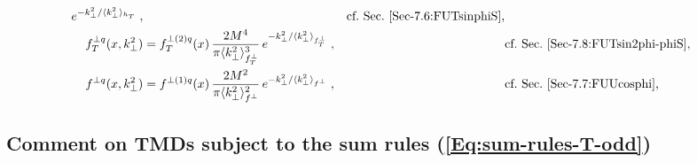 \documentclass[a4paper,11pt]{article}
\newcommand{\la}{\langle}
\newcommand{\ra}{\rangle}
\def\kperp{k_\perp}
\def\avkperp{\la \kperp^2 \ra}
\begin{document}
{\begin{subequations}
\begin{align}
		e^{-\kperp^2/{\avkperp_{h_{T}}}}\;,
	  && 	\mbox{cf.\ Sec.~\ref{Sec-7.6:FUTsinphiS},}
		\label{eq:hTnew}\\
	f^{\perp q}_{T}(x,\kperp^2) 
	  &= 	f^{\perp (2) q}_{T}(x)\,\frac{2 M^4}{\pi \avkperp^3_{f_{T}^{\perp} }}\,
		e^{-\kperp^2/{\avkperp_{f_{T}^{\perp} }}}\;,
	  && 	\mbox{cf.\ Sec.~\ref{Sec-7.8:FUTsin2phi-phiS},}
		\label{eq:ftperpnew}\\
	f^{\perp q}(x,\kperp^2) 
	  &= 	f^{\perp (1) q}(x) \,\frac{2 M^2}{\pi \avkperp_{f^\perp}^2}\,
		e^{-\kperp^2/{\avkperp_{f^\perp}}}\;,
	  && 	\mbox{cf.\ Sec.~\ref{Sec-7.7:FUUcosphi},}
		\label{eq:fperpnew}
\end{align}\end{subequations}

{}


\subsection{Comment on TMDs subject to the sum rules (\ref{Eq:sum-rules-T-odd})}
\label{App-B:comment-Todd-twist-3}

}
\end{document}
